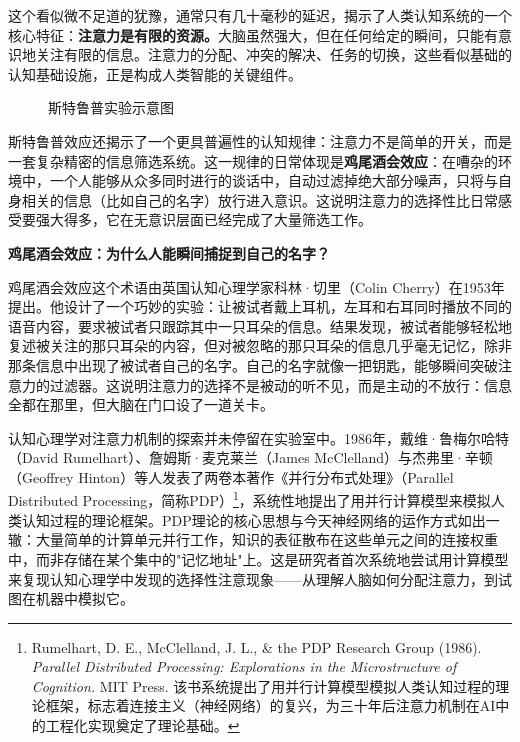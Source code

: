 这个看似微不足道的犹豫，通常只有几十毫秒的延迟，揭示了人类认知系统的一个核心特征：\textbf{注意力是有限的资源。}大脑虽然强大，但在任何给定的瞬间，只能有意识地关注有限的信息。注意力的分配、冲突的解决、任务的切换，这些看似基础的认知基础设施，正是构成人类智能的关键组件。

\begin{figure}[htbp]
\centering
{}
\caption{斯特鲁普实验示意图}
\label{fig:ch1_02}
\end{figure}

斯特鲁普效应还揭示了一个更具普遍性的认知规律：注意力不是简单的开关，而是一套复杂精密的信息筛选系统。这一规律的日常体现是\textbf{鸡尾酒会效应}：在嘈杂的环境中，一个人能够从众多同时进行的谈话中，自动过滤掉绝大部分噪声，只将与自身相关的信息（比如自己的名字）放行进入意识。这说明注意力的选择性比日常感受要强大得多，它在无意识层面已经完成了大量筛选工作。

\begin{funbox}
\small\textbf{鸡尾酒会效应：为什么人能瞬间捕捉到自己的名字？}

鸡尾酒会效应这个术语由英国认知心理学家科林·切里（Colin Cherry）在1953年提出。他设计了一个巧妙的实验：让被试者戴上耳机，左耳和右耳同时播放不同的语音内容，要求被试者只跟踪其中一只耳朵的信息。结果发现，被试者能够轻松地复述被关注的那只耳朵的内容，但对被忽略的那只耳朵的信息几乎毫无记忆，除非那条信息中出现了被试者自己的名字。自己的名字就像一把钥匙，能够瞬间突破注意力的过滤器。这说明注意力的选择不是被动的听不见，而是主动的不放行：信息全都在那里，但大脑在门口设了一道关卡。
\end{funbox}

认知心理学对注意力机制的探索并未停留在实验室中。1986年，戴维·鲁梅尔哈特（David Rumelhart）、詹姆斯·麦克莱兰（James McClelland）与杰弗里·辛顿（Geoffrey Hinton）等人发表了两卷本著作《并行分布式处理》（Parallel Distributed Processing，简称PDP）\footnote{Rumelhart, D. E., McClelland, J. L., \& the PDP Research Group (1986). \textit{Parallel Distributed Processing: Explorations in the Microstructure of Cognition.} MIT Press. 该书系统提出了用并行计算模型模拟人类认知过程的理论框架，标志着连接主义（神经网络）的复兴，为三十年后注意力机制在AI中的工程化实现奠定了理论基础。}，系统性地提出了用并行计算模型来模拟人类认知过程的理论框架。PDP理论的核心思想与今天神经网络的运作方式如出一辙：大量简单的计算单元并行工作，知识的表征散布在这些单元之间的连接权重中，而非存储在某个集中的"记忆地址"上。这是研究者首次系统地尝试用计算模型来复现认知心理学中发现的选择性注意现象——从理解人脑如何分配注意力，到试图在机器中模拟它。

